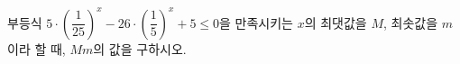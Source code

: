 부등식 $5\cdot\left(\dfrac{1}{25}\right)^{x}-26\cdot\left(\dfrac{1}{5}\right)^{x}+5\le 0$을 만족시키는 $x$의 최댓값을 $M$, 최솟값을 $m$이라 할 때, $Mm$의 값을 구하시오.
